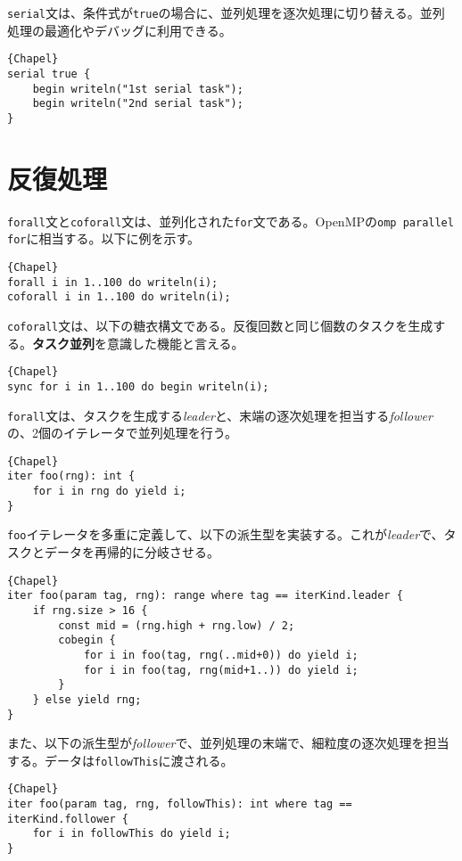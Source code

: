 \documentclass[10pt,a4paper]{book}
\begin{document}
\texttt{serial}文は、条件式が\texttt{true}の場合に、並列処理を逐次処理に切り替える。並列処理の最適化やデバッグに利用できる。

\begin{Verbatim}{Chapel}
serial true {
	begin writeln("1st serial task");
	begin writeln("2nd serial task");
}
\end{Verbatim}

\section{反復処理}

\texttt{forall}文と\texttt{coforall}文は、並列化された\texttt{for}文である。OpenMPの\texttt{omp parallel for}に相当する。以下に例を示す。

\begin{Verbatim}{Chapel}
forall i in 1..100 do writeln(i);
coforall i in 1..100 do writeln(i);
\end{Verbatim}

\texttt{coforall}文は、以下の糖衣構文である。反復回数と同じ個数のタスクを生成する。\textbf{タスク並列}を意識した機能と言える。

\begin{Verbatim}{Chapel}
sync for i in 1..100 do begin writeln(i);
\end{Verbatim}

\texttt{forall}文は、タスクを生成する\textit{leader}と、末端の逐次処理を担当する\textit{follower}の、2個のイテレータで並列処理を行う。

\begin{Verbatim}{Chapel}
iter foo(rng): int {
	for i in rng do yield i;
}
\end{Verbatim}

\texttt{foo}イテレータを多重に定義して、以下の派生型を実装する。これが\textit{leader}で、タスクとデータを再帰的に分岐させる。

\begin{Verbatim}{Chapel}
iter foo(param tag, rng): range where tag == iterKind.leader {
	if rng.size > 16 {
		const mid = (rng.high + rng.low) / 2;
		cobegin {
			for i in foo(tag, rng(..mid+0)) do yield i;
			for i in foo(tag, rng(mid+1..)) do yield i;
		}
	} else yield rng;
}
\end{Verbatim}

また、以下の派生型が\textit{follower}で、並列処理の末端で、細粒度の逐次処理を担当する。データは\texttt{followThis}に渡される。

\begin{Verbatim}{Chapel}
iter foo(param tag, rng, followThis): int where tag == iterKind.follower {
	for i in followThis do yield i;
}
\end{Verbatim}
\end{document}
